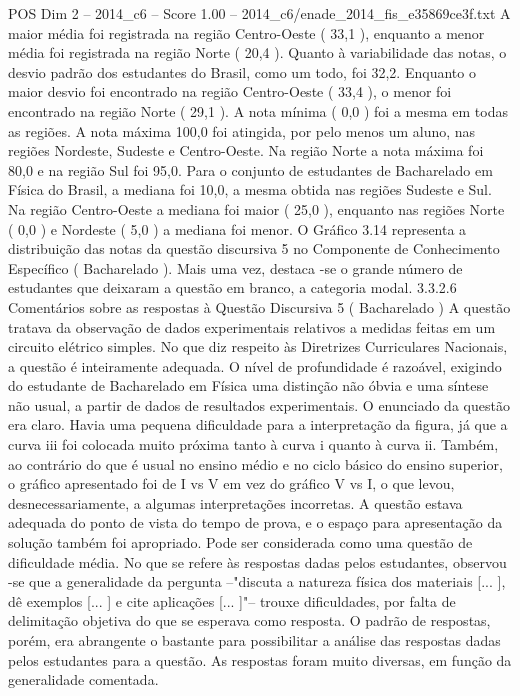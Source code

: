 \begin{textsample}{POS Dim 2 – 2014\_c6 – Score 1.00 – 2014\_c6/enade\_2014\_fis\_e35869ce3f.txt}
A maior média foi registrada na região Centro-Oeste ( 33,1 ), enquanto a menor média foi registrada na região Norte ( 20,4 ).
Quanto à variabilidade das notas, o desvio padrão dos estudantes do Brasil, como um todo, foi 32,2.
Enquanto o maior desvio foi encontrado na região Centro-Oeste ( 33,4 ), o menor foi encontrado na região Norte ( 29,1 ).
A nota mínima ( 0,0 ) foi a mesma em todas as regiões.
A nota máxima 100,0 foi atingida, por pelo menos um aluno, nas regiões Nordeste, Sudeste e Centro-Oeste.
Na região Norte a nota máxima foi 80,0 e na região Sul foi 95,0.
Para o conjunto de estudantes de Bacharelado em Física do Brasil, a mediana foi 10,0, a mesma obtida nas regiões Sudeste e Sul.
Na região Centro-Oeste a mediana foi maior ( 25,0 ), enquanto nas regiões Norte ( 0,0 ) e Nordeste ( 5,0 ) a mediana foi menor.
O Gráfico 3.14 representa a distribuição das notas da questão discursiva 5 no Componente de Conhecimento Específico ( Bacharelado ).
Mais uma vez, destaca -se o grande número de estudantes que deixaram a questão em branco, a categoria modal. 3.3.2.6 Comentários sobre as respostas à Questão Discursiva 5 ( Bacharelado ) A questão tratava da observação de dados experimentais relativos a medidas feitas em um circuito elétrico simples.
No que diz respeito às Diretrizes Curriculares Nacionais, a questão é inteiramente adequada.
O nível de profundidade é razoável, exigindo do estudante de Bacharelado em Física uma distinção não óbvia e uma síntese não usual, a partir de dados de resultados experimentais.
O enunciado da questão era claro.
Havia uma pequena dificuldade para a interpretação da figura, já que a curva iii foi colocada muito próxima tanto à curva i quanto à curva ii.
Também, ao contrário do que é usual no ensino médio e no ciclo básico do ensino superior, o gráfico apresentado foi de I vs V em vez do gráfico V vs I, o que levou, desnecessariamente, a algumas interpretações incorretas.
A questão estava adequada do ponto de vista do tempo de prova, e o espaço para apresentação da solução também foi apropriado.
Pode ser considerada como uma questão de dificuldade média.
No que se refere às respostas dadas pelos estudantes, observou -se que a generalidade da pergunta –"discuta a natureza física dos materiais [... ], dê exemplos [... ] e cite aplicações [... ]"– trouxe dificuldades, por falta de delimitação objetiva do que se esperava como resposta.
O padrão de respostas, porém, era abrangente o bastante para possibilitar a análise das respostas dadas pelos estudantes para a questão.
As respostas foram muito diversas, em função da generalidade comentada.

\end{textsample}
